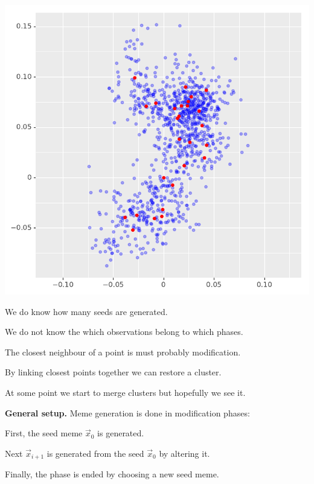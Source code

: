 \documentclass[landscape,footrule]{foils}
\begin{document}
{\includegraphics[scale=0.55]{meme_generation_iv}}

\begin{triangles}
\item We do know how many seeds are generated.
\item We do not know the which observations belong to which phases.
\item The closest neighbour of a point is must probably modification.
\item By linking closest points together we can restore a cluster.
\item At some point we start to merge clusters but hopefully we see it.
\end{triangles}



\textbf{General setup.} Meme generation is done in modification phases:
\begin{triangles}
\item First, the seed meme $\vec{x}_0$ is generated.
\item Next $\vec{x}_{i+1}$ is generated from the seed $\vec{x}_0$ by altering it.
\item Finally, the phase is ended by choosing a new seed meme. \vspace*{2ex}
\end{triangles} 
\end{document}
